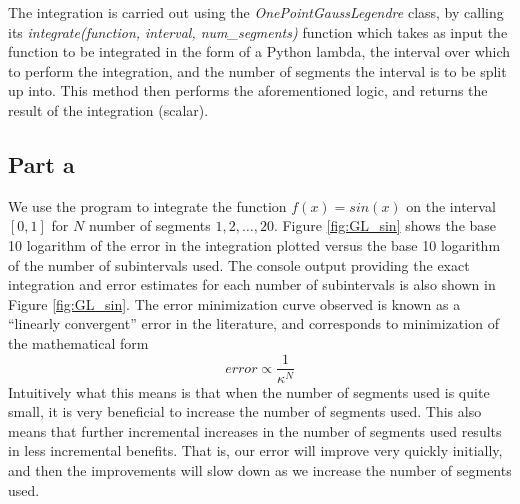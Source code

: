 \documentclass[11pt]{article}
\begin{document}
The integration is carried out using the \textit{OnePointGaussLegendre} class, by calling its \textit{integrate(function, interval, num\_segments)} function which takes as input the function to be integrated in the form of a Python lambda, the interval over which to perform the integration, and the number of segments the interval is to be split up into. This method then performs the aforementioned logic, and returns the result of the integration (scalar).

\subsection*{Part a}
We use the program to integrate the function $f(x) = sin(x)$ on the interval $[0, 1]$ for $N$ number of segments $1, 2, \ldots , 20$. Figure \ref{fig:GL_sin} shows the base 10 logarithm of the error in the integration plotted versus the base 10 logarithm of the number of subintervals used. The console output providing the exact integration and error estimates for each number of subintervals is also shown in Figure \ref{fig:GL_sin}. The error minimization curve observed is known as a ``linearly convergent'' error in the literature, and corresponds to minimization of the mathematical form
$$ error \propto \frac{1}{\kappa^N} $$
Intuitively what this means is that when the number of segments used is quite small, it is very beneficial to increase the number of segments used. This also means that further incremental increases in the number of segments used results in less incremental benefits. That is, our error will improve very quickly initially, and then the improvements will slow down as we increase the number of segments used.
\end{document}

